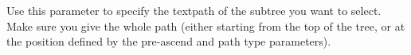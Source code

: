 
Use this parameter to specify the textpath of the subtree you want to select. Make sure you give the whole path (either starting from the top of the tree, or at the position defined by the pre-ascend and path type parameters).



